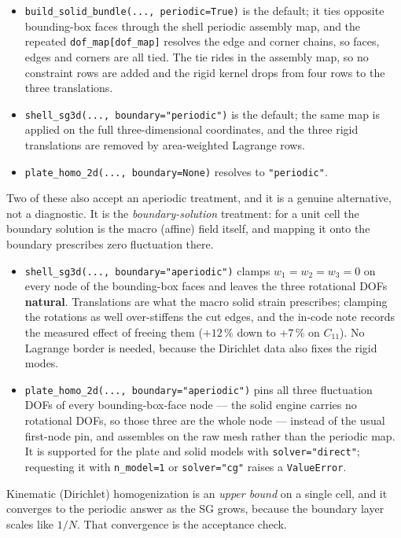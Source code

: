 \begin{itemize}
\item \texttt{build\_solid\_bundle(..., periodic=True)} is the default; it ties
  opposite bounding-box faces through the shell periodic assembly map, and the
  repeated \texttt{dof\_map[dof\_map]} resolves the edge and corner chains, so
  faces, edges and corners are all tied. The tie rides in the assembly map, so
  no constraint rows are added and the rigid kernel drops from four rows to the
  three translations.
\item \texttt{shell\_sg3d(..., boundary="periodic")} is the default; the same
  map is applied on the full three-dimensional coordinates, and the three rigid
  translations are removed by area-weighted Lagrange rows.
\item \texttt{plate\_homo\_2d(..., boundary=None)} resolves to
  \texttt{"periodic"}.
\end{itemize}

Two of these also accept an aperiodic treatment, and it is a genuine
alternative, not a diagnostic. It is the \emph{boundary-solution} treatment:
for a unit cell the boundary solution is the macro (affine) field itself, and
mapping it onto the boundary prescribes zero fluctuation there.

\begin{itemize}
\item \texttt{shell\_sg3d(..., boundary="aperiodic")} clamps
  $w_1 = w_2 = w_3 = 0$ on every node of the bounding-box faces and leaves the
  three rotational DOFs \textbf{natural}. Translations are what the macro solid
  strain prescribes; clamping the rotations as well over-stiffens the cut
  edges, and the in-code note records the measured effect of freeing them
  ($+12\,\%$ down to $+7\,\%$ on $C_{11}$). No Lagrange border is needed,
  because the Dirichlet data also fixes the rigid modes.
\item \texttt{plate\_homo\_2d(..., boundary="aperiodic")} pins all three
  fluctuation DOFs of every bounding-box-face node --- the solid engine carries
  no rotational DOFs, so those three are the whole node --- instead of the usual
  first-node pin, and assembles on the raw mesh rather than the periodic map.
  It is supported for the plate and solid models with
  \texttt{solver="direct"}; requesting it with \texttt{n\_model=1} or
  \texttt{solver="cg"} raises a \texttt{ValueError}.
\end{itemize}

Kinematic (Dirichlet) homogenization is an \emph{upper bound} on a single cell,
and it converges to the periodic answer as the SG grows, because the boundary
layer scales like $1/N$. That convergence is the acceptance check.

